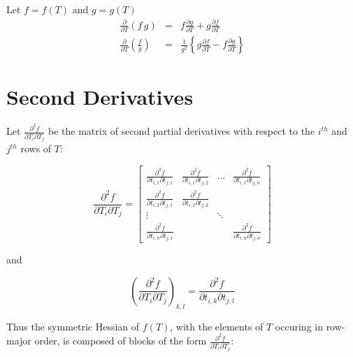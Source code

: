 \documentclass{report}
\begin{document}
\noindent Let $f=f(T)$ and $g=g(T)$
\begin{eqnarray}
\frac{\partial}{\partial T} \left( f \, g \right) & = & f \frac{\partial g}{\partial T} + g \frac{\partial f}{\partial T} \label{prod1} \\
\frac{\partial}{\partial T} \left( \frac{f}{g} \right) & = & \frac{1}{g^2} \left\{ g \frac{\partial f}{\partial T} - f \frac{\partial g}{\partial T} \right\} \label{quotient1}
\end{eqnarray}


\section{Second Derivatives}

Let $\frac{\partial^2 f}{\partial T_i \partial T_j}$ be the matrix of second partial derivatives with respect to the $i^{th}$ and $j^{th}$ rows of $T$:

\begin{equation}
\frac{\partial^2 f}{\partial T_i \partial T_j} = 
\left[ \begin{array}{cccc}
\frac{\partial^2 f}{\partial t_{i,1} \partial t_{j,1}} &
\frac{\partial^2 f}{\partial t_{i,1} \partial t_{j,2}} &
\ldots &
\frac{\partial^2 f}{\partial t_{i,1} \partial t_{j,n}} \\
\frac{\partial^2 f}{\partial t_{i,2} \partial t_{j,1}} &
\frac{\partial^2 f}{\partial t_{i,2} \partial t_{j,2}} \\
\vdots & & \ddots \\
\frac{\partial^2 f}{\partial t_{i,n} \partial t_{j,1}} & & &
\frac{\partial^2 f}{\partial t_{i,n} \partial t_{j,n}}
\end{array} \right]
\end{equation}

and

\begin{equation}
\label{dsecelem}
\left(\frac{\partial^2 f}{\partial T_i \partial T_j}\right)_{k,l} = 
\frac{\partial^2 f}{\partial t_{i,k} \partial t_{j,l}}
\end{equation}

Thus the symmetric Hessian of $f(T)$, with the elements of $T$ occuring in row-major order, is composed of blocks of the form $\frac{\partial^2 f}{\partial T_i \partial T_j}$:
\end{document}
